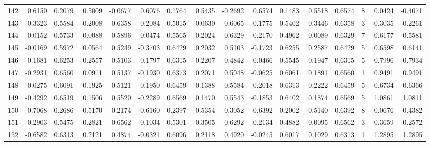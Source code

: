 \begin{tabular}{lrrrrrrrrrrrrrrr}
142 &      0.6150 &  0.2079 &  0.5009 & -0.0677 &  0.6076 &  0.1764 &  0.5435 & -0.2692 &  0.6574 &  0.1483 &   0.5518 &     0.6574 &      8 &                    0.0424 &                    -0.4071 \\
143 &      0.3323 &  0.5584 & -0.2008 &  0.6358 &  0.2084 &  0.5015 & -0.0630 &  0.6065 &  0.1775 &  0.5402 &  -0.3446 &     0.6358 &      3 &                    0.3035 &                     0.2261 \\
144 &      0.0152 &  0.5733 &  0.0088 &  0.5896 &  0.0474 &  0.5565 & -0.2024 &  0.6329 &  0.2170 &  0.4962 &  -0.0089 &     0.6329 &      7 &                    0.6177 &                     0.5581 \\
145 &     -0.0169 &  0.5972 &  0.0564 &  0.5249 & -0.3703 &  0.6429 &  0.2032 &  0.5103 & -0.1723 &  0.6255 &   0.2587 &     0.6429 &      5 &                    0.6598 &                     0.6141 \\
146 &     -0.1681 &  0.6253 &  0.2557 &  0.5103 & -0.1797 &  0.6315 &  0.2207 &  0.4842 &  0.0466 &  0.5545 &  -0.1947 &     0.6315 &      5 &                    0.7996 &                     0.7934 \\
147 &     -0.2931 &  0.6560 &  0.0911 &  0.5137 & -0.1930 &  0.6373 &  0.2071 &  0.5048 & -0.0625 &  0.6061 &   0.1891 &     0.6560 &      1 &                    0.9491 &                     0.9491 \\
148 &     -0.0275 &  0.6091 &  0.1925 &  0.5121 & -0.1950 &  0.6459 &  0.1388 &  0.5584 & -0.2018 &  0.6313 &   0.2222 &     0.6459 &      5 &                    0.6734 &                     0.6366 \\
149 &     -0.4292 &  0.6519 &  0.1506 &  0.5520 & -0.2289 &  0.6569 &  0.1470 &  0.5543 & -0.1853 &  0.6402 &   0.1874 &     0.6569 &      5 &                    1.0861 &                     1.0811 \\
150 &      0.7068 &  0.2686 &  0.5170 & -0.2174 &  0.6160 &  0.2397 &  0.5354 & -0.3052 &  0.6392 &  0.2002 &   0.5140 &     0.6392 &      8 &                   -0.0676 &                    -0.4382 \\
151 &      0.2903 &  0.5475 & -0.2821 &  0.6562 &  0.1034 &  0.5301 & -0.3505 &  0.6292 &  0.2134 &  0.4882 &  -0.0095 &     0.6562 &      3 &                    0.3659 &                     0.2572 \\
152 &     -0.6582 &  0.6313 &  0.2121 &  0.4874 & -0.0321 &  0.6096 &  0.2118 &  0.4920 & -0.0245 &  0.6017 &   0.1029 &     0.6313 &      1 &                    1.2895 &                     1.2895 \\

\end{tabular}
